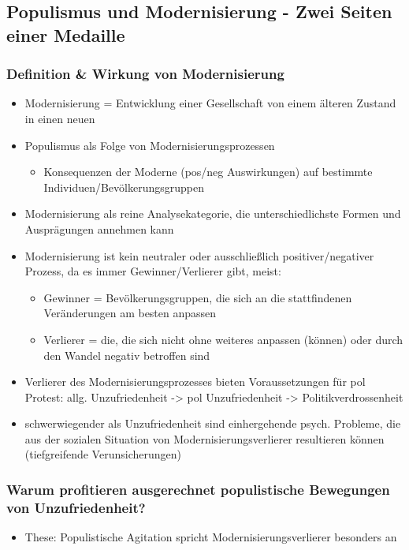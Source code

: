\documentclass[11pt]{article}
\begin{document}
\subsection{Populismus und Modernisierung - Zwei Seiten einer Medaille}
\label{sec:orge678627}
\subsubsection{Definition \& Wirkung von Modernisierung}
\label{sec:orgb14c809}
\begin{itemize}
\item Modernisierung = Entwicklung einer Gesellschaft von einem älteren Zustand in einen neuen
\item Populismus als Folge von Modernisierungsprozessen
\begin{itemize}
\item Konsequenzen der Moderne (pos/neg Auswirkungen) auf bestimmte Individuen/Bevölkerungsgruppen
\end{itemize}
\item Modernisierung als reine Analysekategorie, die unterschiedlichste Formen und Ausprägungen annehmen kann
\item Modernisierung ist kein neutraler oder ausschließlich positiver/negativer Prozess, da es immer Gewinner/Verlierer gibt, meist:
\begin{itemize}
\item Gewinner = Bevölkerungsgruppen, die sich an die stattfindenen Veränderungen am besten anpassen
\item Verlierer = die, die sich nicht ohne weiteres anpassen (können) oder durch den Wandel negativ betroffen sind
\end{itemize}
\item Verlierer des Modernisierungsprozesses bieten Voraussetzungen für pol Protest: allg. Unzufriedenheit -> pol Unzufriedenheit -> Politikverdrossenheit
\item schwerwiegender als Unzufriedenheit sind einhergehende psych. Probleme, die aus der sozialen Situation von Modernisierungsverlierer resultieren können (tiefgreifende Verunsicherungen)
\end{itemize}
\subsubsection{Warum profitieren ausgerechnet populistische Bewegungen von Unzufriedenheit?}
\label{sec:org14b683b}
\begin{itemize}
\item These: Populistische Agitation spricht Modernisierungsverlierer besonders an
\end{itemize}
\end{document}
